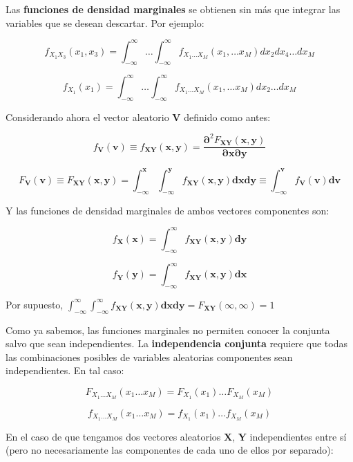 \documentclass[11pt]{article}
\begin{document}
Las \textbf{funciones de densidad marginales} se obtienen sin más que
integrar las variables que se desean descartar. Por ejemplo:

\[
f_{X_1X_3}(x_1,x_3) = \int_{-\infty}^{\infty}\ldots \int_{-\infty}^{\infty} f_{X_1\ldots X_M} (x_1, \ldots x_M) dx_2 dx_4 \ldots dx_M
\]

\[
f_{X_1}(x_1) = \int_{-\infty}^{\infty}\ldots \int_{-\infty}^{\infty} f_{X_1\ldots X_M} (x_1, \ldots x_M) dx_2 \ldots dx_M
\]

    Considerando ahora el vector aleatorio \(\mathbf{V}\) definido como
antes:

\[
f_{\mathbf{V}}(\mathbf{v}) \equiv f_\mathbf{XY}(\mathbf{x},\mathbf{y}) = 
\frac{\boldsymbol{\partial}^2 F_{\mathbf{XY}}(\mathbf{x},\mathbf{y})}{\boldsymbol{\partial} \mathbf{x}\boldsymbol{\partial} \mathbf{y}}
\]

\[
F_\mathbf{V}(\mathbf{v}) \equiv F_{\mathbf{X} \mathbf{Y}}(\mathbf{x},\mathbf{y}) = \int_{-\boldsymbol{\infty}}^{\mathbf{x}}\int_{-\boldsymbol{\infty}}^{\mathbf{y}} f_{\mathbf{X}\mathbf{Y}}(\mathbf{x},\mathbf{y}) \mathbf{dx dy} \equiv 
\boldsymbol{\int}_{\boldsymbol{-\infty}}^{\mathbf{v}} f_\mathbf{V}(\mathbf{v})\mathbf{dv} 
\]

Y las funciones de densidad marginales de ambos vectores componentes
son:

\[
f_{\mathbf{X}}(\mathbf{x}) = \boldsymbol{\int}_{-\boldsymbol{\infty}}^{\boldsymbol{\infty}} f_{\mathbf{XY}}(\mathbf{x}, \mathbf{y}) \mathbf{dy}
\]

\[
f_{\mathbf{Y}}(\mathbf{y}) = \boldsymbol{\int}_{-\boldsymbol{\infty}}^{\boldsymbol{\infty}} f_{\mathbf{XY}}(\mathbf{x}, \mathbf{y}) \mathbf{dx}
\]

Por supuesto, \(\int_{-\boldsymbol{\infty}}^{\boldsymbol{\infty}}\int_{-\boldsymbol{\infty}}^{\boldsymbol{\infty}} f_{\mathbf{X}\mathbf{Y}}(\mathbf{x},\mathbf{y}) \mathbf{dx dy} = F_{\mathbf{X} \mathbf{Y}}(\infty,\infty) = 1\)


    Como ya sabemos, las funciones marginales no permiten conocer la
conjunta salvo que sean independientes. La \textbf{independencia
conjunta} requiere que todas las combinaciones posibles de variables
aleatorias componentes sean independientes. En tal caso:

\[
F_{X_1 \ldots X_M}(x_1 \ldots x_M) = F_{X_1}(x_1) \ldots F_{X_M}(x_M)
\]

\[
f_{X_1 \ldots X_M}(x_1 \ldots x_M) = f_{X_1}(x_1) \ldots f_{X_M}(x_M)
\]

En el caso de que tengamos dos vectores aleatorios \(\mathbf{X}\),
\(\mathbf{Y}\) independientes entre sí (pero no necesariamente las
componentes de cada uno de ellos por separado):
\end{document}

